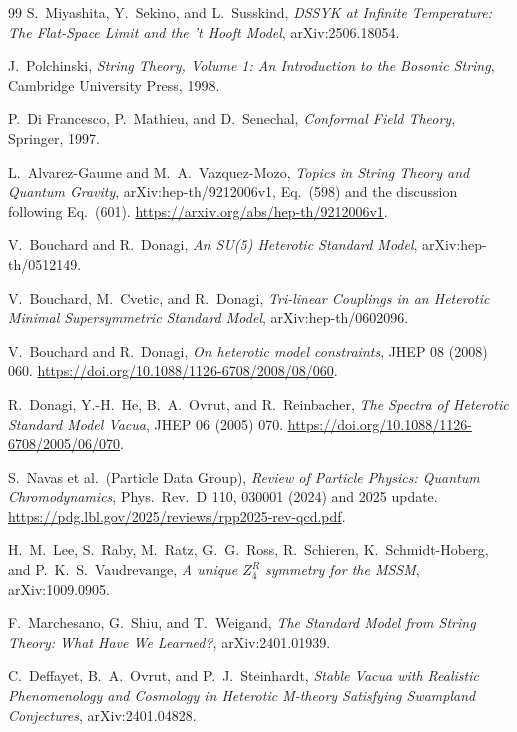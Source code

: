 \documentclass[11pt]{article}
\theoremstyle{remark}
\theoremstyle{plain}
\begin{document}
\begin{thebibliography}{99}
S.\ Miyashita, Y.\ Sekino, and L.\ Susskind,
\emph{DSSYK at Infinite Temperature: The Flat-Space Limit and the 't Hooft Model},
arXiv:2506.18054.

J.\ Polchinski,
\emph{String Theory, Volume 1: An Introduction to the Bosonic String},
Cambridge University Press, 1998.

P.\ Di Francesco, P.\ Mathieu, and D.\ Senechal,
\emph{Conformal Field Theory},
Springer, 1997.

L.\ Alvarez-Gaume and M.\ A.\ Vazquez-Mozo,
\emph{Topics in String Theory and Quantum Gravity},
arXiv:hep-th/9212006v1, Eq.~(598) and the discussion following Eq.~(601).
\url{https://arxiv.org/abs/hep-th/9212006v1}.

V.\ Bouchard and R.\ Donagi,
\emph{An SU(5) Heterotic Standard Model},
arXiv:hep-th/0512149.

V.\ Bouchard, M.\ Cvetic, and R.\ Donagi,
\emph{Tri-linear Couplings in an Heterotic Minimal Supersymmetric Standard Model},
arXiv:hep-th/0602096.

V.\ Bouchard and R.\ Donagi,
\emph{On heterotic model constraints},
JHEP 08 (2008) 060.
\url{https://doi.org/10.1088/1126-6708/2008/08/060}.

R.\ Donagi, Y.-H.\ He, B.\ A.\ Ovrut, and R.\ Reinbacher,
\emph{The Spectra of Heterotic Standard Model Vacua},
JHEP 06 (2005) 070.
\url{https://doi.org/10.1088/1126-6708/2005/06/070}.

S.\ Navas et al.\ (Particle Data Group),
\emph{Review of Particle Physics: Quantum Chromodynamics},
Phys.\ Rev.\ D 110, 030001 (2024) and 2025 update.
\url{https://pdg.lbl.gov/2025/reviews/rpp2025-rev-qcd.pdf}.

H.\ M.\ Lee, S.\ Raby, M.\ Ratz, G.\ G.\ Ross, R.\ Schieren, K.\ Schmidt-Hoberg, and
P.\ K.\ S.\ Vaudrevange,
\emph{A unique \(Z_4^R\) symmetry for the MSSM},
arXiv:1009.0905.

F.\ Marchesano, G.\ Shiu, and T.\ Weigand,
\emph{The Standard Model from String Theory: What Have We Learned?},
arXiv:2401.01939.

C.\ Deffayet, B.\ A.\ Ovrut, and P.\ J.\ Steinhardt,
\emph{Stable Vacua with Realistic Phenomenology and Cosmology in Heterotic M-theory Satisfying Swampland Conjectures},
arXiv:2401.04828.


\end{thebibliography}
\end{document}
